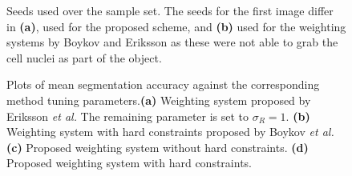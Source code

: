 \begin{figure}[!h]
	\centering
	
	\caption{Seeds used over the sample set. The seeds for the first image differ in \textbf{(a)}, used for the proposed scheme, and \textbf{(b)} used for the weighting systems by Boykov and Eriksson as these were not able to grab the cell nuclei as part of the object.}
	\label{fig:samplesetseed}
\end{figure}

\begin{figure}[!t]
	\centering


	\caption{Plots of mean segmentation accuracy against the corresponding method tuning parameters.\textbf{(a)} Weighting system proposed by Eriksson \textit{et al.} The remaining parameter is set to $\sigma_R=1$. \textbf{(b)} Weighting system with hard constraints proposed by Boykov \textit{et al.} \textbf{(c)} Proposed weighting system without hard constraints. \textbf{(d)} Proposed weighting system with hard constraints.}
	\label{fig:interactiveweightingcomparison}
\end{figure}



